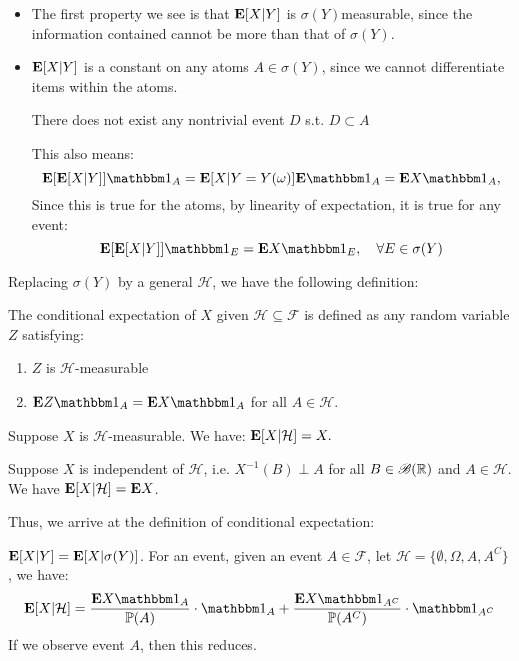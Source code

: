 \documentclass[../main/main.tex]{subfiles}
\begin{document}
\begin{itemize}
	\item The first property we see is that $\text{\textbf{E}}[X | Y]$ is $\sigma(Y)$measurable, since the information contained cannot be more than that of $\sigma(Y)$.
	\item $\text{\textbf{E}}[X | Y]$ is a constant on any atoms $A \in \sigma(Y)$, since we cannot differentiate items within the atoms.
	      \begin{definition} There does not exist any nontrivial event $D$ s.t. $D \subset A$
	      \end{definition}
	      This also means: \[
		      \E[\E[X | Y]] \ind_A = \E[X | Y = Y(\omega)]\E \ind_A = \E X \ind_A,
	      \] Since this is true for the atoms, by linearity of expectation, it is true for any event: \[
		      \E [\E[X | Y]]\ind_E = \E X \ind_E ,\quad \forall E \in \sigma(Y)
	      \]
\end{itemize}
Replacing $\sigma(Y)$ by a general $\mathcal{H}$, we have the following definition:

\begin{definition} The conditional expectation of $X$ given $\mathcal{H}\subseteq\mathscr{F}$ is defined as any random variable $Z$ satisfying:
	\begin{enumerate}
		\item $Z$ is $\mathcal{H}$-measurable
		\item $\E Z \ind_A = \E X \ind_A$ for all $A \in \mathcal{H}$.
	\end{enumerate}
\end{definition}

\begin{example}
	Suppose $X$ is $\mathcal{H}$-measurable. We have: $ \text{\textbf{E}}[X | \mathcal{H}] = X.$
\end{example}
\begin{example}
	Suppose $X$ is independent of $\mathcal{H}$, i.e. $X^{-1}(B) \perp A$ for all $B \in \mathscr{B}(\mathbb{R})$ and $A \in \mathcal{H}$. We have $\text{\textbf{E}}[X | \mathcal{H}] = \text{\textbf{E}} X$.
\end{example}

Thus, we arrive at the definition of conditional expectation:
\begin{definition}
	$\text{\textbf{E}}[X | Y] = \text{\textbf{E}}[X | \sigma(Y)]$. For an event, given an event $A \in \mathscr{F}$, let $\mathcal{H} = \{\emptyset, \Omega, A , A^{C}\}$, we have: \[
		\E[X | \mathcal{H}] = \frac{\E X \ind_A}{\P(A)} \cdot \ind_A + \frac{\E X \ind_{A^{C}}}{\P(A^{C})} \cdot \ind_{A^{C}}
	\] If we observe event $A$, then this reduces.
\end{definition}
\end{document}
